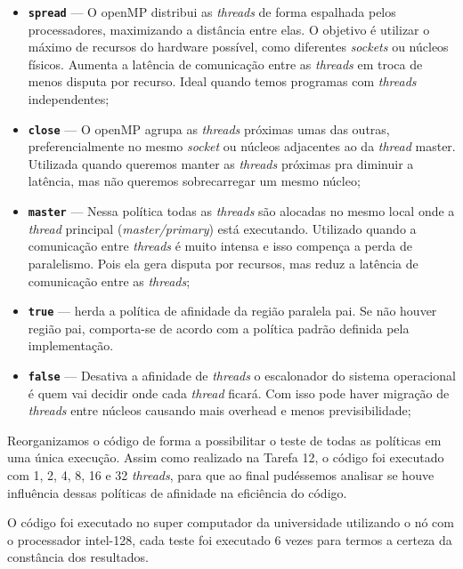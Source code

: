 \documentclass[a4paper, 12pt]{article}
\begin{document}
	\begin{itemize}
		\item \textbf{\texttt{spread}} — O openMP distribui as \textit{threads} de forma espalhada pelos processadores, maximizando a distância entre elas. O objetivo é utilizar o máximo de recursos do hardware possível, como diferentes \textit{sockets} ou núcleos físicos. Aumenta a latência de comunicação entre as \textit{threads} em troca de menos disputa por recurso. Ideal quando temos programas com \textit{threads} independentes;
		
		\item \textbf{\texttt{close}} — O openMP agrupa as \textit{threads} próximas umas das outras, preferencialmente no mesmo \textit{socket} ou núcleos adjacentes ao da \textit{thread} master. Utilizada quando queremos manter as \textit{threads} próximas pra diminuir a latência, mas não queremos sobrecarregar um mesmo núcleo;
		
		\item \textbf{\texttt{master}} — Nessa política todas as \textit{threads} são alocadas no mesmo local onde a \textit{thread} principal (\textit{master/primary}) está executando. Utilizado quando a comunicação entre \textit{threads} é muito intensa e isso compença a perda de paralelismo. Pois ela gera disputa por recursos, mas reduz a latência de comunicação entre as \textit{threads};
		
		\item \textbf{\texttt{true}} — herda a política de afinidade da região paralela pai. Se não houver região pai, comporta-se de acordo com a política padrão definida pela implementação.
		
		\item \textbf{\texttt{false}} — Desativa a afinidade de \textit{threads} o escalonador do sistema operacional é quem vai decidir onde cada \textit{thread} ficará. Com isso pode haver migração de \textit{threads} entre núcleos causando mais overhead e menos previsibilidade;
	\end{itemize}
	
	\hspace{0.62cm}Reorganizamos o código de forma a possibilitar o teste de todas as políticas em uma única execução. Assim como realizado na Tarefa 12, o código foi executado com 1, 2, 4, 8, 16 e 32 \textit{threads}, para que ao final pudéssemos analisar se houve influência dessas políticas de afinidade na eficiência do código.
	
	O código foi executado no super computador da universidade utilizando o nó com o processador intel-128, cada teste foi executado 6 vezes para termos a certeza da constância dos resultados.
	
\end{document}
